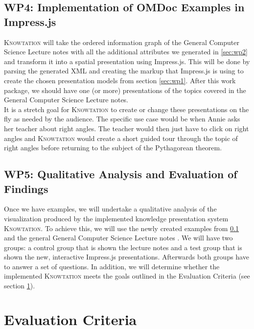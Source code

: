 \documentclass[twoside, 12pt]{article}
\newcommand{\sys}{\textsc{Knowtation}\xspace}
\begin{document}
\subsection{WP4: Implementation of OMDoc Examples in Impress.js}
\label{sec:wp4}

\sys will take the ordered information graph of the General Computer Science Lecture notes \cite{Kohlhase:GenCSI:base} with all the additional attributes we generated in \ref{sec:wp2} and transform it into a spatial presentation using Impress.js. This will be done by parsing the generated XML and creating the markup that Impress.js is using to create the chosen presentation models from section \ref{sec:wp1}. After this work package, we should have one (or more) presentations of the topics covered in the General Computer Science Lecture notes.\\

It is a stretch goal for \sys to create or change these presentations on the fly as needed by the audience. The specific use case would be when Annie asks her teacher about right angles. The teacher would then just have to click on right angles and \sys would create a short guided tour through the topic of right angles before returning to the subject of the Pythagorean theorem.\\

\subsection{WP5: Qualitative Analysis and Evaluation of Findings}
\label{sec:wp5}

Once we have examples, we will undertake a qualitative analysis of the visualization produced by the implemented knowledge presentation system \sys . To achieve this, we will use the newly created examples from \ref{sec:wp4} and the general General Computer Science Lecture notes \cite{Kohlhase:GenCSI:base}. We will have two groups: a control group that is shown the lecture notes and a test group that is shown the new, interactive Impress.js presentations. Afterwards both groups have to answer a set of questions. In addition, we will determine whether the implemented \sys meets the goals outlined in the Evaluation Criteria (see section \ref{sec:evalcriteria}).\\

\section{Evaluation Criteria}
\label{sec:evalcriteria}
\end{document}

